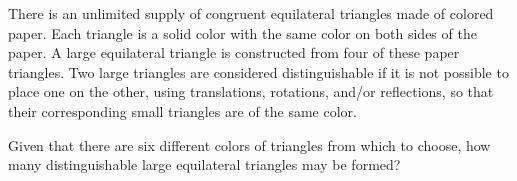 There is an unlimited supply of congruent equilateral triangles made of colored paper. Each triangle is a solid color with the same color on both sides of the paper. A large equilateral triangle is constructed from four of these paper triangles. Two large triangles are considered distinguishable if it is not possible to place one on the other, using translations, rotations, and/or reflections, so that their corresponding small triangles are of the same color.

Given that there are six different colors of triangles from which to choose, how many distinguishable large equilateral triangles may be formed?